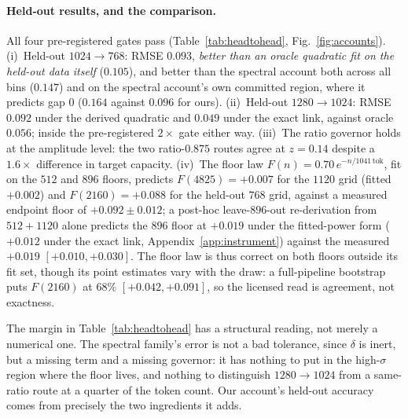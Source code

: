 \paragraph{Held-out results, and the comparison.}
All four pre-registered gates pass (Table~\ref{tab:headtohead},
Fig.~\ref{fig:accounts}). (i)~Held-out $1024{\to}768$: RMSE $0.093$,
\emph{better than an oracle quadratic fit on the held-out data itself}
($0.105$), and better than the spectral account both across all bins
($0.147$) and on the spectral account's own committed region, where it
predicts gap $0$ ($0.164$ against $0.096$ for ours).
(ii)~Held-out $1280{\to}1024$: RMSE $0.092$ under the derived quadratic
and $0.049$ under the exact link, against oracle $0.056$; inside the
pre-registered $2\times$ gate either way. (iii)~The ratio governor
holds at the amplitude level: the two ratio-$0.875$ routes agree at
$z = 0.14$ despite a $1.6\times$ difference in target capacity.
(iv)~The floor law $F(n) = 0.70\,e^{-n/1041\,\mathrm{tok}}$, fit on the
$512$ and $896$ floors, predicts $F(4825) = +0.007$ for the $1120$ grid
(fitted $+0.002$) and $F(2160) = +0.088$ for the held-out $768$ grid,
against a measured endpoint floor of $+0.092 \pm 0.012$; a post-hoc
leave-$896$-out re-derivation from $512{+}1120$ alone predicts the
$896$ floor at $+0.019$ under the fitted-power form ($+0.012$ under
the exact link, Appendix~\ref{app:instrument}) against the measured
$+0.019$ $[+0.010, +0.030]$. The floor law is thus correct on both floors
outside its fit set, though its point estimates vary with the draw: a
full-pipeline bootstrap puts $F(2160)$ at $68\%$ $[+0.042, +0.091]$,
so the licensed read is agreement, not exactness.

The margin in Table~\ref{tab:headtohead} has a structural reading, not
merely a numerical one. The spectral family's error is not a bad
tolerance, since $\delta$ is inert, but a missing term and a missing
governor: it has nothing to put in the high-$\sigma$ region where the
floor lives, and nothing to distinguish $1280{\to}1024$ from a
same-ratio route at a quarter of the token count. Our account's
held-out accuracy comes from precisely the two ingredients it adds.

